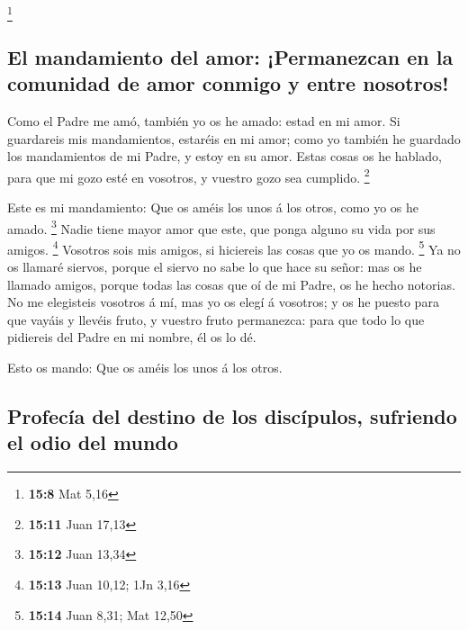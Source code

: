 \footnote{\textbf{15:8} Mat 5,16}

\hypertarget{el-mandamiento-del-amor-permanezcan-en-la-comunidad-de-amor-conmigo-y-entre-nosotros}{%
\subsection{El mandamiento del amor: ¡Permanezcan en la comunidad de
amor conmigo y entre
nosotros!}\label{el-mandamiento-del-amor-permanezcan-en-la-comunidad-de-amor-conmigo-y-entre-nosotros}}

 Como el Padre me amó, también yo os he amado: estad en mi
amor.  Si guardareis mis mandamientos, estaréis en mi amor;
como yo también he guardado los mandamientos de mi Padre, y estoy en su
amor.  Estas cosas os he hablado, para que mi gozo esté en
vosotros, y vuestro gozo sea cumplido. \footnote{\textbf{15:11} Juan
  17,13}

 Este es mi mandamiento: Que os améis los unos á los otros,
como yo os he amado. \footnote{\textbf{15:12} Juan 13,34} 
Nadie tiene mayor amor que este, que ponga alguno su vida por sus
amigos. \footnote{\textbf{15:13} Juan 10,12; 1Jn 3,16} 
Vosotros sois mis amigos, si hiciereis las cosas que yo os mando.
\footnote{\textbf{15:14} Juan 8,31; Mat 12,50}  Ya no os
llamaré siervos, porque el siervo no sabe lo que hace su señor: mas os
he llamado amigos, porque todas las cosas que oí de mi Padre, os he
hecho notorias.  No me elegisteis vosotros á mí, mas yo os
elegí á vosotros; y os he puesto para que vayáis y llevéis fruto, y
vuestro fruto permanezca: para que todo lo que pidiereis del Padre en mi
nombre, él os lo dé.

 Esto os mando: Que os améis los unos á los otros.

\hypertarget{profecuxeda-del-destino-de-los-discuxedpulos-sufriendo-el-odio-del-mundo}{%
\subsection{Profecía del destino de los discípulos, sufriendo el odio
del
mundo}\label{profecuxeda-del-destino-de-los-discuxedpulos-sufriendo-el-odio-del-mundo}}

